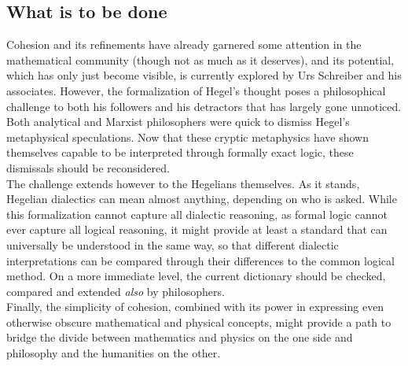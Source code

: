 \documentclass{article}
\begin{document}
\subsection{What is to be done}
Cohesion and its refinements have already garnered some attention in the mathematical community (though
not as much as it deserves), and its potential, which has only just become visible, is currently explored
by Urs Schreiber and his associates. However, the formalization of Hegel's thought poses a philosophical
challenge to both his followers and his detractors that has largely gone unnoticed. Both analytical and
Marxist philosophers were quick to dismiss Hegel's metaphysical speculations. Now that these cryptic 
metaphysics have shown themselves capable to be interpreted through formally exact logic, these dismissals should
be reconsidered. \\

The challenge extends however to the Hegelians themselves. As it stands, Hegelian dialectics can mean
almost anything, depending on who is asked. While this formalization cannot capture all dialectic reasoning,
as formal logic cannot ever capture all logical reasoning, it might provide at least a standard that can
universally be understood in the same way, so that different dialectic interpretations can be compared
through their differences to the common logical method. On a more immediate level, the current dictionary
should be checked, compared and extended \emph{also} by philosophers. \\

Finally, the simplicity of cohesion, combined with its power in expressing even otherwise obscure mathematical
and physical concepts, might provide a path to bridge the divide between mathematics and physics on the
one side and philosophy and the humanities on the other.







\printbibliography[
heading=bibintoc,
title={References}
]
\end{document}
